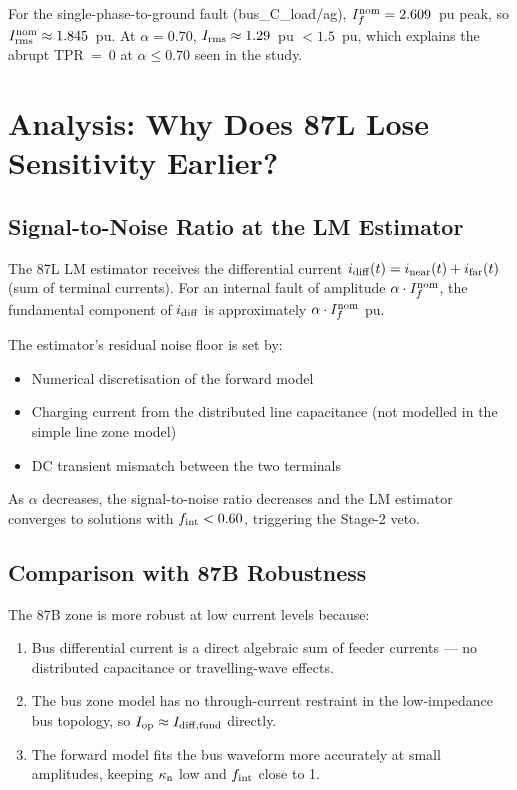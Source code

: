 \documentclass[12pt,a4paper]{article}
\newcommand{\kappan}{\kappa_{\rm n}}
\newcommand{\fint}{f_{\rm int}}
\newcommand{\Iop}{I_{\rm op}}
\begin{document}
For the single-phase-to-ground fault (bus\_C\_load/ag), $I_f^{\rm nom}
= 2.609$~pu peak, so $I_{\rm rms}^{\rm nom} \approx 1.845$~pu.  At
$\alpha = 0.70$, $I_{\rm rms} \approx 1.29$~pu $< 1.5$~pu, which
explains the abrupt TPR~=~0 at $\alpha \leq 0.70$ seen in the study.

\section{Analysis: Why Does 87L Lose Sensitivity Earlier?}

\subsection{Signal-to-Noise Ratio at the LM Estimator}

The 87L LM estimator receives the differential current
$i_{\rm diff}(t) = i_{\rm near}(t) + i_{\rm far}(t)$ (sum of terminal
currents).  For an internal fault of amplitude $\alpha \cdot I_f^{\rm nom}$,
the fundamental component of $i_{\rm diff}$ is approximately
$\alpha \cdot I_f^{\rm nom}$ pu.

The estimator's residual noise floor is set by:
\begin{itemize}[noitemsep]
  \item Numerical discretisation of the forward model
  \item Charging current from the distributed line capacitance
    (not modelled in the simple line zone model)
  \item DC transient mismatch between the two terminals
\end{itemize}

As $\alpha$ decreases, the signal-to-noise ratio decreases and the LM
estimator converges to solutions with $\fint < 0.60$, triggering the
Stage-2 veto.

\subsection{Comparison with 87B Robustness}

The 87B zone is more robust at low current levels because:
\begin{enumerate}[noitemsep]
  \item Bus differential current is a direct algebraic sum of feeder
    currents — no distributed capacitance or travelling-wave effects.
  \item The bus zone model has no through-current restraint in the
    low-impedance bus topology, so $\Iop \approx I_{\rm diff,fund}$
    directly.
  \item The forward model fits the bus waveform more accurately at
    small amplitudes, keeping $\kappan$ low and $\fint$ close to 1.
\end{enumerate}
\end{document}
